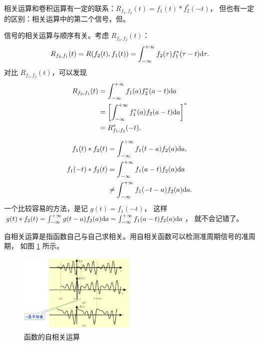 \begin{remark}
    相关运算和卷积运算有一定的联系：$R_{f_1, f_2}(t) = f_1(t) * f_2^*(-t)$，
    但也有一定的区别：相关运算中的第二个信号，但。
\end{remark}

\begin{property}
    信号的相关运算与顺序有关。考虑 $R_{f_2, f_2}(t)$：
    \begin{align*}
        R_{f_2, f_1}(t) = R(f_2(t), f_1(t)) = \int_{-\infty}^{+\infty}f_2(\tau)f_1^*(\tau - t)\mathrm{d}\tau.
    \end{align*}
    对比 $R_{f_1, f_2}(t)$，可以发现
    \begin{align*}
        R_{f_2, f_1}(t) & = \int_{-\infty}^{+\infty}f_1(a)f_2^*(a - t)\mathrm{d}a \\
        & = \left[\int_{-\infty}^{+\infty}f_1^*(a)f_2(a - t)\mathrm{d}a\right]^* \\
        & = R_{f_1, f_2}^*(-t).
    \end{align*}
\end{property}

\begin{note}
    \begin{align*}
        f_1(t) * f_2(t) & = \int_{-\infty}^{+\infty}f_1(t - a)f_2(a)\mathrm{d}a, \\
        f_1(-t) * f_2(t) & = \int_{-\infty}^{+\infty}f_1(a - t)f_2(a)\mathrm{d}a \\
        & \neq \int_{-\infty}^{+\infty}f_1(-t - a)f_2(a)\mathrm{d}a.
    \end{align*}
    一个比较容易的方法，是记 $g(t) = f_1(-t)$，
    这样 $g(t) * f_2(t) = \int_{-\infty}^{+\infty}g(t - a)f_2(a)\mathrm{d}a = \int_{-\infty}^{+\infty}f_1(a - t)f_2(a)\mathrm{d}a$，
    就不会记错了。
\end{note}

\begin{example}[自相关运算]
    自相关运算是指函数自己与自己求相关。用自相关函数可以检测准周期信号的准周期，
    如图 \ref{fig:self-relation} 所示。
    \begin{figure}[H]
        \centering
        \includegraphics[width=0.5\textwidth]{chap1/img/self-relation.png}
        \caption{函数的自相关运算}
        \label{fig:self-relation}
    \end{figure}
\end{example}

